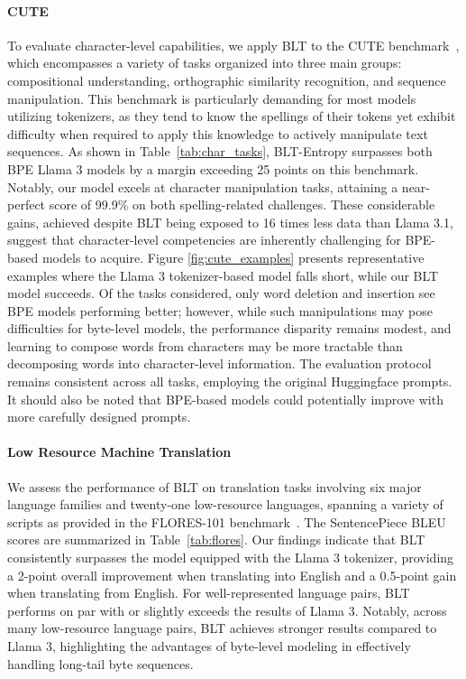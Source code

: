 \paragraph{CUTE}
To evaluate character-level capabilities, we apply {\textsc BLT} to the CUTE benchmark~\citep{edman2024cute}, which encompasses a variety of tasks organized into three main groups: compositional understanding, orthographic similarity recognition, and sequence manipulation. This benchmark is particularly demanding for most models utilizing tokenizers, as they tend to know the spellings of their tokens yet exhibit difficulty when required to apply this knowledge to actively manipulate text sequences. As shown in Table~\ref{tab:char_tasks}, {\textsc BLT}-Entropy surpasses both BPE Llama 3 models by a margin exceeding 25 points on this benchmark. Notably, our model excels at character manipulation tasks, attaining a near-perfect score of 99.9\% on both spelling-related challenges. These considerable gains, achieved despite {\textsc BLT} being exposed to 16 times less data than Llama 3.1, suggest that character-level competencies are inherently challenging for BPE-based models to acquire. Figure \ref{fig:cute_examples} presents representative examples where the Llama 3 tokenizer-based model falls short, while our {\textsc BLT} model succeeds. Of the tasks considered, only word deletion and insertion see BPE models performing better; however, while such manipulations may pose difficulties for byte-level models, the performance disparity remains modest, and learning to compose words from characters may be more tractable than decomposing words into character-level information. The evaluation protocol remains consistent across all tasks, employing the original Huggingface prompts. It should also be noted that BPE-based models could potentially improve with more carefully designed prompts.

\paragraph{Low Resource Machine Translation} We assess the performance of {\textsc BLT} on translation tasks involving six major language families and twenty-one low-resource languages, spanning a variety of scripts as provided in the FLORES-101 benchmark~\citep{goyal2022flores}. The SentencePiece BLEU scores are summarized in Table~\ref{tab:flores}. Our findings indicate that {\textsc BLT} consistently surpasses the model equipped with the Llama 3 tokenizer, providing a 2-point overall improvement when translating into English and a 0.5-point gain when translating from English. For well-represented language pairs, {\textsc BLT} performs on par with or slightly exceeds the results of Llama 3. Notably, across many low-resource language pairs, {\textsc BLT} achieves stronger results compared to Llama 3, highlighting the advantages of byte-level modeling in effectively handling long-tail byte sequences.

